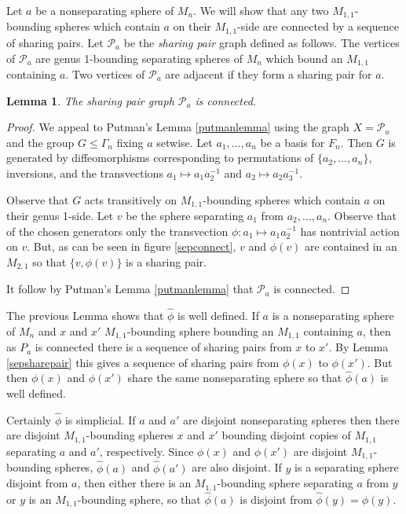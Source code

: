 \documentclass[11pt]{article}
\newtheorem{lemma}[theorem]{Lemma}
\theoremstyle{remark}
\theoremstyle{definition}
\begin{document}
Let $a$ be a nonseparating sphere of $M_n$.
We will show that any two $M_{1,1}$-bounding spheres
which contain $a$ on their $M_{1,1}$-side are connected by a sequence of
sharing pairs.
Let $\mathcal P_a$ be the \emph{sharing pair} graph defined as follows.
The vertices of $\mathcal P_a$
are genus 1-bounding separating spheres of $M_n$ which
bound an $M_{1,1}$ containing $a$.
Two vertices of $\mathcal P_a$ are adjacent
if they form a sharing pair for $a$.

\begin{lemma}
  \label{seppairgraph}
The sharing pair graph $\mathcal P_a$ is connected.
\end{lemma}

\begin{proof}
We appeal to Putman's Lemma \ref{putmanlemma}
using the graph $X=\mathcal P_a$ and the group
$G \leq \Gamma_n$ fixing $a$ setwise.
Let $a_1, \ldots, a_n$ be a basis for $F_n$.
Then $G$ is generated by
diffeomorphisms corresponding to
permutations of $\{a_2, \ldots, a_n\}$,
inversions, and the transvections
$a_1 \mapsto a_1a^{-1}_2$ and $a_2 \mapsto a_2a^{-1}_3$.

Observe that $G$ acts transitively on
$M_{1,1}$-bounding spheres
which contain $a$ on their genus 1-side.
Let $v$ be the sphere separating
$a_1$ from $a_2, \ldots, a_n$.
Observe that of the chosen generators only
the transvection $\phi: a_1 \mapsto a_1a^{-1}_2$
has nontrivial action on $v$.
But, as can be seen in figure \ref{sepconnect},
 $v$ and $\phi(v)$
 are contained in an $M_{2,1}$
 so that  $\{ v, \phi(v) \}$ is a sharing pair.

 It follow by Putman's Lemma \ref{putmanlemma} that $\mathcal P_a$ is connected.
\end{proof}

The previous Lemma shows that $\hat \phi$ is well defined.
If $a$ is a nonseparating sphere of $M_n$
and $x$ and $x'$ $M_{1,1}$-bounding sphere bounding an $M_{1,1}$ containing $a$,
then as $P_a$ is connected there is a sequence of sharing pairs from $x$ to $x'$.
By Lemma \ref{sepsharepair} this gives a sequence of
sharing pairs from $\phi(x)$ to $\phi(x')$.
But then $\phi(x)$ and $\phi(x')$ share the same nonseparating sphere
so that $\hat \phi (a)$ is well defined.

Certainly $\hat \phi$ is simplicial.
If $a$ and $a'$ are disjoint nonseparating spheres
then there are disjoint $M_{1,1}$-bounding spheres $x$ and $x'$ bounding
disjoint copies of $M_{1,1}$ separating $a$ and $a'$, respectively.
Since $\phi(x)$ and $\phi(x')$ are disjoint $M_{1,1}$-bounding spheres,
$\hat \phi(a)$ and $\hat \phi(a')$ are also disjoint.
If $y$ is a separating sphere disjoint from $a$, then
either there is an $M_{1,1}$-bounding sphere separating $a$ from $y$
or $y$ is an $M_{1,1}$-bounding sphere, so that $\hat \phi(a)$ is disjoint from $\hat \phi (y) = \phi(y)$.
\end{document}
